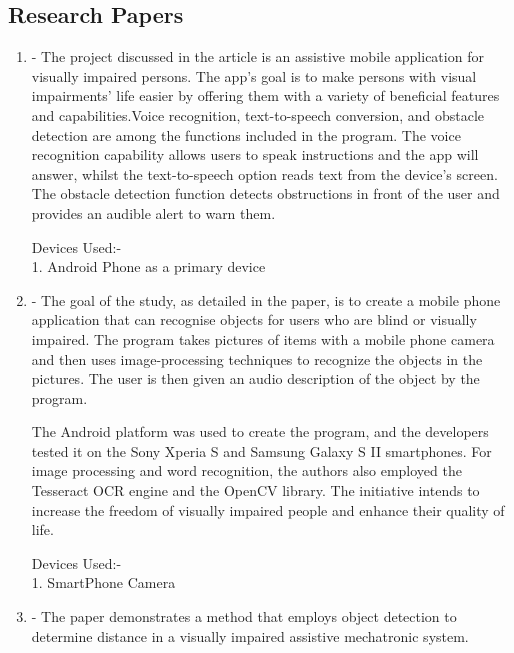 \documentclass[MScCS]{uccthesis}
\begin{document}
\subsection{Research Papers}
\begin{enumerate}
        \item \textbf{\Parencite{Assistive}}-  The project discussed in the article is an assistive mobile application for visually impaired persons. The app's goal is to make persons with visual impairments' life easier by offering them with a variety of beneficial features and capabilities.Voice recognition, text-to-speech conversion, and obstacle detection are among the functions included in the program. The voice recognition capability allows users to speak instructions and the app will answer, whilst the text-to-speech option reads text from the device's screen. The obstacle detection function detects obstructions in front of the user and provides an audible alert to warn them.

Devices Used:-\\
1. Android Phone as a primary device


\item \textbf{\Parencite{Obj}}-  The goal of the study, as detailed in the paper, is to create a mobile phone application that can recognise objects for users who are blind or visually impaired. The program takes pictures of items with a mobile phone camera and then uses image-processing techniques to recognize the objects in the pictures. The user is then given an audio description of the object by the program.

The Android platform was used to create the program, and the developers tested it on the Sony Xperia S and Samsung Galaxy S II smartphones. For image processing and word recognition, the authors also employed the Tesseract OCR engine and the OpenCV library. The initiative intends to increase the freedom of visually impaired people and enhance their quality of life.

Devices Used:-\\
1. SmartPhone Camera


\item \textbf{\Parencite{distance}}- The paper demonstrates a method that employs object detection to determine distance in a visually impaired assistive mechatronic system.


\end{enumerate}
\end{document}
